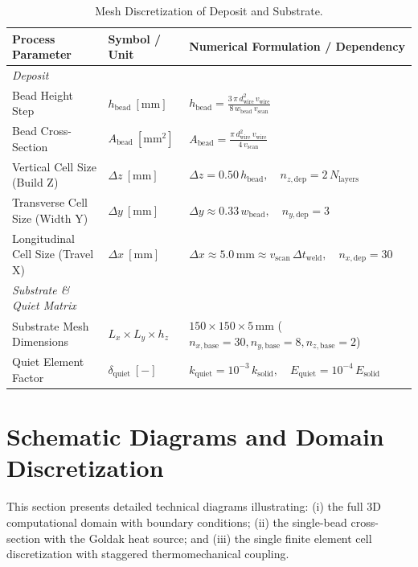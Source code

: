 \documentclass[10pt,a4paper]{article}
\begin{document}
\begin{table}[h!]
\centering
\small
\caption{Mesh Discretization of Deposit and Substrate.}
\label{tab:mesh_matrix}
\vspace{0.4em}
\begin{tabularx}{\textwidth}{p{4.2cm} p{2.2cm} X}
\toprule
\textbf{Process Parameter} & \textbf{Symbol / Unit} & \textbf{Numerical Formulation / Dependency} \\
\midrule
\textit{Deposit} & & \\
Bead Height Step & $h_{\mathrm{bead}}\ [\mathrm{mm}]$ & $h_{\mathrm{bead}} = \frac{3\,\pi\,d_{\mathrm{wire}}^2\,v_{\mathrm{wire}}}{8\,w_{\mathrm{bead}}\,v_{\mathrm{scan}}}$ \\
\addlinespace[0.2em]
Bead Cross-Section & $A_{\mathrm{bead}}\ [\mathrm{mm^2}]$ & $A_{\mathrm{bead}} = \frac{\pi\,d_{\mathrm{wire}}^2\,v_{\mathrm{wire}}}{4\,v_{\mathrm{scan}}}$ \\
\addlinespace[0.2em]
Vertical Cell Size (Build Z) & $\Delta z\ [\mathrm{mm}]$ & $\Delta z = 0.50\,h_{\mathrm{bead}}, \quad n_{z,\mathrm{dep}} = 2\,N_{\mathrm{layers}}$ \\
\addlinespace[0.2em]
Transverse Cell Size (Width Y) & $\Delta y\ [\mathrm{mm}]$ & $\Delta y \approx 0.33\,w_{\mathrm{bead}}, \quad n_{y,\mathrm{dep}} = 3$ \\
\addlinespace[0.2em]
Longitudinal Cell Size (Travel X) & $\Delta x\ [\mathrm{mm}]$ & $\Delta x \approx 5.0\,\mathrm{mm} \approx v_{\mathrm{scan}}\,\Delta t_{\mathrm{weld}}, \quad n_{x,\mathrm{dep}} = 30$ \\
\addlinespace[0.3em]
\textit{Substrate \& Quiet Matrix} & & \\
Substrate Mesh Dimensions & $L_x \times L_y \times h_z$ & $150 \times 150 \times 5\,\mathrm{mm}$ ($n_{x,\mathrm{base}}=30, n_{y,\mathrm{base}}=8, n_{z,\mathrm{base}}=2$) \\
\addlinespace[0.2em]
Quiet Element Factor & $\delta_{\mathrm{quiet}}\ [-]$ & $k_{\mathrm{quiet}} = 10^{-3}\,k_{\mathrm{solid}}, \quad E_{\mathrm{quiet}} = 10^{-4}\,E_{\mathrm{solid}}$ \\
\bottomrule
\end{tabularx}
\end{table}

\newpage
\section{Schematic Diagrams and Domain Discretization}
This section presents detailed technical diagrams illustrating: (i) the full 3D computational domain with boundary conditions; (ii) the single-bead cross-section with the Goldak heat source; and (iii) the single finite element cell discretization with staggered thermomechanical coupling.
\end{document}

